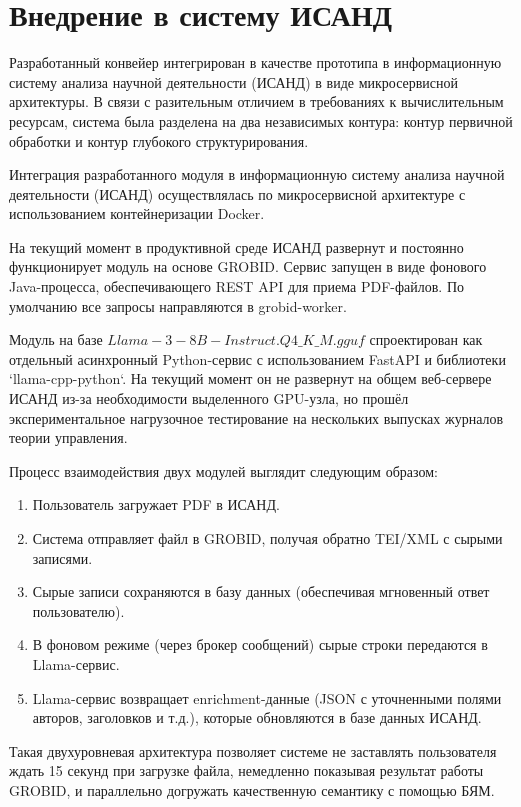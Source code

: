 \section{Внедрение в систему ИСАНД}

Разработанный конвейер интегрирован в качестве прототипа в информационную систему анализа научной деятельности (ИСАНД) в виде микросервисной архитектуры. В связи с разительным отличием в требованиях к вычислительным ресурсам, система была разделена на два независимых контура: контур первичной обработки и контур глубокого структурирования.

Интеграция разработанного модуля в информационную систему анализа научной деятельности (ИСАНД) осуществлялась по микросервисной архитектуре с использованием контейнеризации Docker.

На текущий момент в продуктивной среде ИСАНД развернут и постоянно функционирует модуль на основе GROBID. Сервис запущен в виде фонового Java-процесса, обеспечивающего REST API для приема PDF-файлов. По умолчанию все запросы направляются в grobid-worker.

Модуль на базе $Llama-3-8B-Instruct.Q4\_K\_M.gguf$ спроектирован как отдельный асинхронный Python-сервис с использованием FastAPI и библиотеки `llama-cpp-python`. На текущий момент он не развернут на общем веб-сервере ИСАНД из-за необходимости выделенного GPU-узла, но прошёл экспериментальное нагрузочное тестирование на нескольких выпусках журналов теории управления. 

Процесс взаимодействия двух модулей выглядит следующим образом:
\begin{enumerate}
    \item Пользователь загружает PDF в ИСАНД.
    \item Система отправляет файл в GROBID, получая обратно TEI/XML с сырыми записями.
    \item Сырые записи сохраняются в базу данных (обеспечивая мгновенный ответ пользователю).
    \item В фоновом режиме (через брокер сообщений) сырые строки передаются в Llama-сервис.
    \item Llama-сервис возвращает enrichment-данные (JSON с уточненными полями авторов, заголовков и т.д.), которые обновляются в базе данных ИСАНД.
\end{enumerate}
Такая двухуровневая архитектура позволяет системе не заставлять пользователя ждать 15 секунд при загрузке файла, немедленно показывая результат работы GROBID, и параллельно догружать качественную семантику с помощью БЯМ.

